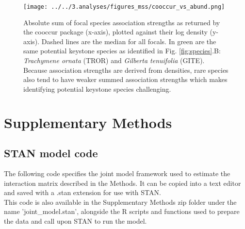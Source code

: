 \documentclass[a4,12pt]{article}
\begin{document}
\clearpage
\newpage

    \begin{figure}[H]
        \begin{centering}
        \texttt{[image: ../../3.analyses/figures\_mss/cooccur\_vs\_abund.png]}
        \caption{Absolute sum of focal species association strengths as returned by the cooccur package (x-axis), plotted against their log density (y-axis). Dashed lines are the median for all focals. In green are the same potential keystone species as identified in Fig. \ref{fig:species}.B: \textit{Trachymene ornata} (TROR) and \textit{Gilberta tenuifolia} (GITE). Because association strengths are derived from densities, rare species also tend to have weaker summed association strengths which makes identifying potential keystone species challenging.}
        \label{fig:coocab}
        \end{centering}
    \end{figure} 


\newpage 

\section{Supplementary Methods}

\setcounter{figure}{0}

\label{SI:Methods}

    \subsection{STAN model code}
    \label{SI:modelcode}
    The following code specifies the joint model framework used to estimate the interaction matrix described in the Methods. It can be copied into a text editor and saved with a .stan extension for use with STAN. \\

    This code is also available in the Supplementary Methods zip folder under the name 'joint\_model.stan', alongside the R scripts and functions used to prepare the data and call upon STAN to run the model. \\
\end{document}
